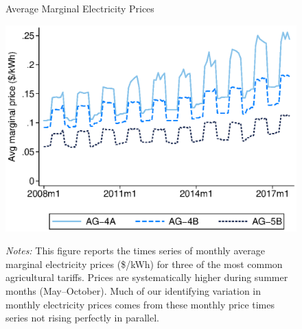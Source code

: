 \vspace{35mm}
\begin{figure}[h!]\centering
\captionsetup{width=\textwidth}
\caption{Average Marginal Electricity Prices}
\label{fig:marg_price_3rates}
\vspace{-2mm}
{\includegraphics[width=.8\textwidth]{figures/marg_price_3rates.eps}}\\
\captionsetup{width=.85\textwidth}
\caption*{\footnotesize \emph{Notes:} This figure reports the times series of monthly average marginal electricity prices (\$/kWh) for three of the most common agricultural tariffs. Prices are systematically higher during summer months (May--October). Much of our identifying variation in monthly electricity prices comes from these monthly price times series not rising perfectly in parallel. }
\end{figure}